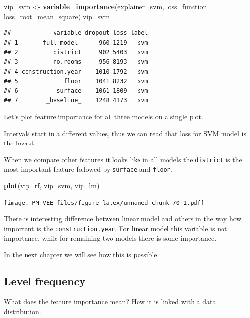\documentclass[12pt,]{krantz}
\newenvironment{Shaded}{\begin{snugshade}}{\end{snugshade}}
\newcommand{\DataTypeTok}[1]{\textcolor[rgb]{0.13,0.29,0.53}{#1}}
\newcommand{\KeywordTok}[1]{\textcolor[rgb]{0.13,0.29,0.53}{\textbf{#1}}}
\newcommand{\NormalTok}[1]{#1}
\newcommand{\StringTok}[1]{\textcolor[rgb]{0.31,0.60,0.02}{#1}}
\begin{document}
\begin{Shaded}
\begin{Highlighting}[]
\NormalTok{vip_svm <-}\StringTok{ }\KeywordTok{variable_importance}\NormalTok{(explainer_svm, }
            \DataTypeTok{loss_function =}\NormalTok{ loss_root_mean_square)}
\NormalTok{vip_svm}
\end{Highlighting}
\end{Shaded}

\begin{verbatim}
##            variable dropout_loss label
## 1      _full_model_     960.1219   svm
## 2          district     902.5403   svm
## 3          no.rooms     956.8193   svm
## 4 construction.year    1010.1792   svm
## 5             floor    1041.8232   svm
## 6           surface    1061.1809   svm
## 7        _baseline_    1248.4173   svm
\end{verbatim}

Let's plot feature importance for all three models on a single plot.

Intervals start in a different values, thus we can read that loss for SVM model is the lowest.

When we compare other features it looks like in all models the \texttt{district} is the most important feature followed by \texttt{surface} and \texttt{floor}.

\begin{Shaded}
\begin{Highlighting}[]
\KeywordTok{plot}\NormalTok{(vip_rf, vip_svm, vip_lm)}
\end{Highlighting}
\end{Shaded}

\texttt{[image: PM\_VEE\_files/figure-latex/unnamed-chunk-70-1.pdf]}

There is interesting difference between linear model and others in the way how important is the \texttt{construction.year}. For linear model this variable is not importance, while for remaining two models there is some importance.

In the next chapter we will see how this is possible.

\hypertarget{level-frequency}{%
\subsection{Level frequency}\label{level-frequency}}

What does the feature importance mean? How it is linked with a data distribution.
\end{document}

